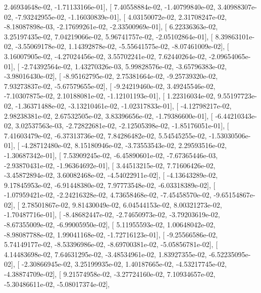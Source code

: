 \documentclass{article}
\begin{document}
          2.46934648e-02,  -1.71133166e-01],
       [  7.40558884e-02,  -1.40799840e-02,   3.40988307e-02,
         -7.93242955e-02,  -1.16030839e-01],
       [  4.03150072e-02,   2.31708247e-02,  -8.18087898e-03,
         -2.17699261e-02,  -2.33500969e-01],
       [  6.22336363e-02,   3.25197435e-02,   7.04219066e-02,
          5.96741757e-02,  -2.05102864e-01],
       [  8.39863101e-02,  -3.55069178e-02,   1.14392878e-02,
         -5.55641575e-02,  -8.07461009e-02],
       [  3.16007905e-02,  -4.27024456e-02,   3.55702241e-02,
          7.62440264e-02,  -2.09654065e-01],
       [ -2.74392564e-02,   1.43270326e-03,   5.99828576e-02,
         -3.65796383e-02,  -3.98016430e-02],
       [ -8.95162795e-02,   2.75381664e-02,  -9.25739320e-02,
          7.93273837e-02,  -5.67579655e-02],
       [ -9.24219460e-02,   3.49245546e-02,  -7.10307875e-02,
          2.10188081e-02,  -1.12101193e-01],
       [  1.22316034e-02,   9.55197723e-02,  -1.36371488e-02,
         -3.13210461e-02,  -1.02317833e-01],
       [ -4.12798217e-02,   2.98238381e-02,   2.67532505e-02,
          3.83396656e-02,  -1.79386600e-01],
       [ -6.44210343e-02,   3.02537563e-03,  -2.72822681e-02,
         -2.12505398e-02,  -1.85176051e-01],
       [  7.41603479e-02,  -6.37313736e-02,   7.84286482e-02,
          5.54545255e-02,  -1.53030506e-01],
       [ -4.28712480e-02,   8.15180946e-02,  -3.73553543e-02,
          2.29593516e-02,  -1.30687342e-01],
       [  7.53909245e-02,  -6.45890601e-02,  -7.67365446e-03,
         -2.93870431e-02,  -1.96364692e-01],
       [  3.44513215e-02,   7.71606426e-02,  -3.45872894e-02,
          3.60082468e-02,  -4.54022911e-02],
       [ -4.13643289e-02,   9.17845953e-02,  -6.91448380e-02,
          7.97773548e-02,  -6.03318389e-02],
       [ -1.07959421e-02,  -2.24216328e-02,   4.73658468e-02,
         -7.45458570e-02,  -9.65154867e-02],
       [  2.78501867e-02,   9.81430049e-02,   6.04544153e-02,
          8.00321273e-02,  -1.70487716e-01],
       [ -8.48682447e-02,  -2.74650973e-02,  -3.79203619e-02,
         -8.67355009e-02,  -6.99005950e-02],
       [  5.11955593e-02,   1.00648042e-02,  -8.98087788e-02,
          1.99041168e-02,  -1.72716123e-01],
       [ -9.25566586e-02,   5.74149177e-02,  -8.53396986e-02,
         -8.69700381e-02,  -5.05856781e-02],
       [  4.14483698e-02,   7.64631295e-02,  -3.48534961e-02,
          1.83927355e-02,  -6.52235095e-02],
       [ -2.30866945e-02,   3.25199935e-02,   1.40187665e-02,
         -4.53217745e-02,  -4.38874709e-02],
       [  9.21574958e-02,  -3.27724160e-02,   7.10934657e-02,
         -5.30486611e-02,  -5.08017374e-02],
\end{document}
